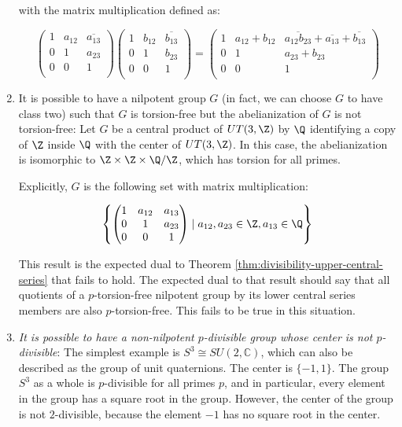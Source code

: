 \documentclass{ucetd}
\begin{document}
\begin{enumerate}
  with the matrix multiplication defined as:

  $$\begin{pmatrix} 1 & a_{12} & \overline{a_{13}} \\ 0 & 1 & a_{23} \\ 0 & 0 & 1 \\\end{pmatrix}\begin{pmatrix} 1 & b_{12} & \overline{b_{13}} \\ 0 & 1 & b_{23} \\ 0 & 0 & 1 \\\end{pmatrix} = \begin{pmatrix} 1 & a_{12} + b_{12} & \overline{a_{12}b_{23}} + \overline{a_{13}} + \overline{b_{13}} \\ 0 & 1 & a_{23} + b_{23} \\ 0 & 0 & 1 \\\end{pmatrix}$$

\item It is possible to have a nilpotent group $G$ (in fact, we can
  choose $G$ to have class two) such that $G$ is torsion-free but the
  abelianization of $G$ is not torsion-free: Let $G$ be a central
  product of $UT(3,\Z)$ by $\Q$ identifying a copy of $\Z$ inside $\Q$
  with the center of $UT(3,\Z)$. In this case, the abelianization is
  isomorphic to $\Z \times \Z \times \Q/\Z$, which has torsion for all
  primes.

  Explicitly, $G$ is the following set with matrix multiplication:

  $$\left \{\begin{pmatrix}
1 & a_{12} & a_{13} \\
0 & 1 & a_{23}\\
0 & 0 & 1\end{pmatrix} \mid a_{12},a_{23} \in \Z, a_{13} \in \Q \right \}$$

  This result is the expected dual to Theorem
  \ref{thm:divisibility-upper-central-series} that fails to hold. The
  expected dual to that result should say that all quotients of a
  $p$-torsion-free nilpotent group by its lower central series members
  are also $p$-torsion-free. This fails to be true in this situation.
\item {\em It is possible to have a non-nilpotent $p$-divisible group
  whose center is not $p$-divisible}: The simplest example is $S^3
  \cong SU(2,\mathbb{C})$, which can also be described as the group of
  unit quaternions. The center is $\{-1,1\}$. The group $S^3$ as a
  whole is $p$-divisible for all primes $p$, and in particular, every
  element in the group has a square root in the group. However, the
  center of the group is not $2$-divisible, because the element $-1$
  has no square root in the center.


\end{enumerate}
\end{document}
